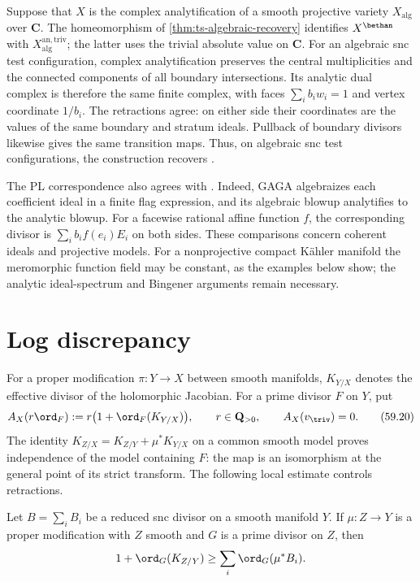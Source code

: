 Suppose that $X$ is the complex analytification of a smooth
projective variety $X_{\mathrm{alg}}$ over $\mathbf C$.
The homeomorphism of \cref{thm:ts-algebraic-recovery} identifies
$X^{\bethan}$ with $X_{\mathrm{alg}}^{\mathrm{an,triv}}$;
the latter uses the trivial absolute value on $\mathbf C$.
For an algebraic snc test configuration, complex analytification
preserves the central multiplicities and the connected components
of all boundary intersections. Its analytic dual complex is
therefore the same finite complex, with faces
$\sum_i b_iw_i=1$ and vertex coordinate $1/b_i$.
The retractions agree: on either side their coordinates are
the values of the same boundary and stratum ideals. Pullback
of boundary divisors likewise gives the same transition maps.
Thus, on algebraic snc test configurations, the construction
recovers \cite[Theorem~A.1, p.~828]{BJ22}.

The PL correspondence also agrees with
\cite[Lemma~A.2, p.~828]{BJ22}. Indeed, GAGA algebraizes each
coefficient ideal in a finite flag expression, and its algebraic
blowup analytifies to the analytic blowup. For a facewise rational
affine function $f$, the corresponding divisor is
$\sum_i b_i f(e_i)E_i$ on both sides. These comparisons concern
coherent ideals and projective models. For a nonprojective
compact K\"ahler manifold the meromorphic function field may
be constant, as the examples below show; the analytic
ideal-spectrum and Bingener arguments remain necessary.

\section{Log discrepancy}
\label{sec:mp-dual-discrepancy}

For a proper modification $\pi:Y\to X$ between smooth manifolds,
$K_{Y/X}$ denotes the effective divisor of the holomorphic
Jacobian. For a prime divisor $F$ on $Y$, put
\[
 A_X(r\ord_F):=r\bigl(1+\ord_F(K_{Y/X})\bigr),
 \qquad r\in\mathbf Q_{>0},\qquad A_X(v_{\triv})=0.
\tag{59.20}\label{eq:mp-ordinary-discrepancy}
\]
The identity $K_{Z/X}=K_{Z/Y}+\mu^*K_{Y/X}$ on a common
smooth model proves independence of the model containing $F$:
the map is an isomorphism at the general point of its strict
transform. The following local estimate controls retractions.

\begin{lemma}\label{lem:mp-log-jacobian-bound}
Let $B=\sum_i B_i$ be a reduced snc divisor on a smooth
manifold $Y$. If $\mu:Z\to Y$ is a proper modification with
$Z$ smooth and $G$ is a prime divisor on $Z$, then
\[
                  1+\ord_G(K_{Z/Y})\geq\sum_i\ord_G(\mu^*B_i).
\]
\end{lemma}

